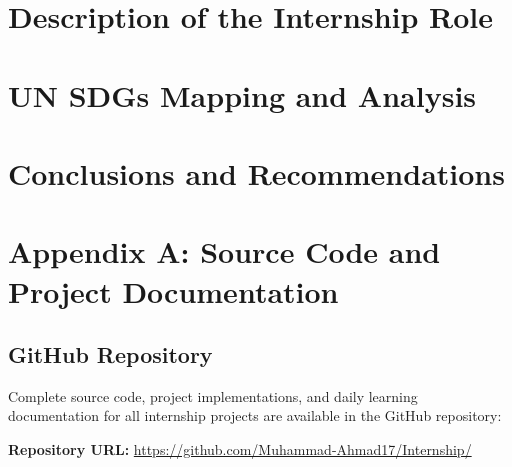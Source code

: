 \chapter{Description of the Internship Role}

\newpage

\chapter{UN SDGs Mapping and Analysis}

\newpage

\chapter{Conclusions and Recommendations}

\newpage

\appendix
\chapter*{Appendix A: Source Code and Project Documentation}

\section{GitHub Repository}

Complete source code, project implementations, and daily learning documentation
for all internship projects are available in the GitHub repository:

\vspace{0.5cm}

\noindent\textbf{Repository URL:} \url{https://github.com/Muhammad-Ahmad17/Internship/}

